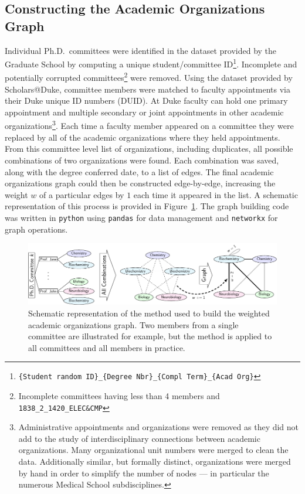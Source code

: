 \documentclass[notitlepage,aps,prd,nofootinbib]{revtex4-1}
\begin{document}
\subsection{Constructing the Academic Organizations Graph}
Individual Ph.D.\ committees were identified in the  dataset provided by the Graduate School by computing a unique student/committee ID\footnote{\texttt{\{Student random ID\}\_\{Degree Nbr\}\_\{Compl Term\}\_\{Acad Org\}}}. Incomplete and potentially corrupted committees\footnote{Incomplete committees having less than 4 members and \texttt{1838\_2\_1420\_ELEC\&CMP}} were removed. Using the  dataset provided by Scholars@Duke, committee members were matched to faculty appointments via their Duke unique ID numbers (DUID). At Duke faculty can hold one primary appointment and multiple secondary or joint appointments in other academic organizations\footnote{Administrative appointments and organizations were removed as they did not add to the study of interdisciplinary connections between academic organizations. Many organizational unit numbers were merged to clean the data. Additionally similar, but formally distinct, organizations were merged by hand in order to simplify the number of nodes --- in particular the numerous Medical School subdisciplines.}. Each time a faculty member appeared on a committee they were replaced by all of the academic organizations where they held appointments. From this committee level list of organizations, including duplicates, all possible combinations of two organizations were found. Each combination was saved, along with the degree conferred date, to a list of edges. The final academic organizations graph could then be constructed edge-by-edge, increasing the weight $w$ of a particular edges by $1$ each time it appeared in the list. A schematic representation of this process is provided in Figure~\ref{fig:method_schematic}. The graph building code was written in \texttt{python} using \texttt{pandas} \cite{pandas} for data management and \texttt{networkx} \cite{networkx} for graph operations.

\begin{figure}[!htb]\centering
  \includegraphics[width=\textwidth]{../poster/tikzout/vis_challenge_2018_poster-matthew_epland-figure0.pdf}
  \caption{Schematic representation of the method used to build the weighted academic organizations graph. Two members from a single committee are illustrated for example, but the method is applied to all committees and all members in practice.}
  \label{fig:method_schematic}
\end{figure}
\end{document}

